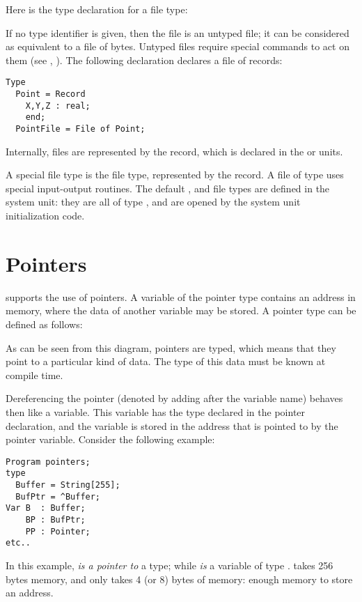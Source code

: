 Here is the type declaration for a file type:

If no type identifier is given, then the file is an untyped file; it can be
considered as equivalent to a file of bytes. Untyped files require special
commands to act on them (see , ).
The following declaration declares a file of records:
\begin{verbatim}
Type
  Point = Record
    X,Y,Z : real;
    end;
  PointFile = File of Point;
\end{verbatim}
Internally, files are represented by the  record, which is
declared in the  or  units.

A special file type is the  file type, represented by the
 record. A file of type  uses special input-output
routines. The default ,  and  file
types are defined in the system unit: they are all of type , and
are opened by the system unit initialization code.

\section{Pointers}
\fpc supports the use of pointers. A variable of the pointer type
contains an address in memory, where the data of another variable may be
stored. A pointer type can be defined as follows:

As can be seen from this diagram, pointers are typed, which means that
they point to a particular kind of data. The type of this data must be
known at compile time.

Dereferencing the pointer (denoted by adding \var{\^{}} after the variable
name) behaves then like a variable. This variable has the type declared in
the pointer declaration, and the variable is stored in the address that is
pointed to by the pointer variable.
Consider the following example:
\begin{verbatim}
Program pointers;
type
  Buffer = String[255];
  BufPtr = ^Buffer;
Var B  : Buffer;
    BP : BufPtr;
    PP : Pointer;
etc..
\end{verbatim}
In this example,  {\em is a pointer to} a  type; while 
{\em is} a variable of type .  takes 256 bytes memory,
and  only takes 4 (or 8) bytes of memory: enough memory to store an
address.


